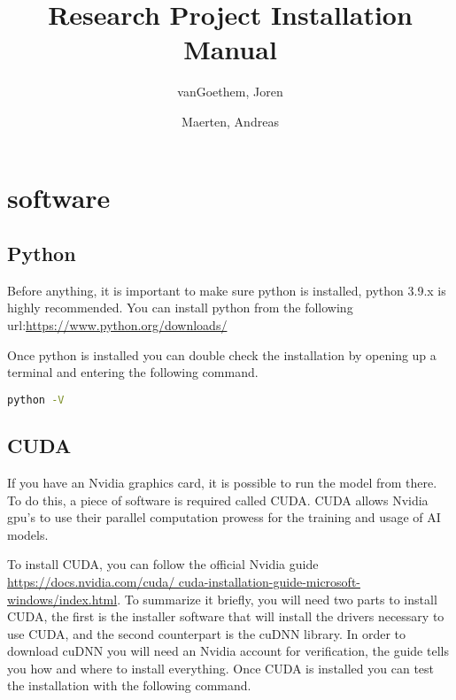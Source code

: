 \documentclass[12pt,a4paper]{article}
\begin{document}
\begin{titlepage}
    \author{
        vanGoethem, Joren
        \and
        Maerten, Andreas
    }
    \title{Research Project Installation Manual}
\end{titlepage}

\maketitle
\newpage
\tableofcontents
\newpage


\section{software}

\subsection{Python}

Before anything, it is important to make sure python is installed, python 3.9.x is highly recommended.
You can install python from the following url:\newline\newline \href{https://www.python.org/downloads/}{https://www.python.org/downloads/}\newline

Once python is installed you can double check the installation by opening up a terminal and entering the following command.

\begin{lstlisting}[language=bash]
    python -V
\end{lstlisting}

\subsection{CUDA}
If you have an Nvidia graphics card, it is possible to run the model from there. To do this, a piece of
software is required called CUDA. CUDA allows Nvidia gpu's to use their parallel computation prowess for
the training and usage of AI models.\newline

To install CUDA, you can follow the official Nvidia guide \href{https://docs.nvidia.com/cuda/
cuda-installation-guide-microsoft-windows/index.html}{https://docs.nvidia.com/cuda/
cuda-installation-guide-microsoft-windows/index.html}. To summarize it briefly, you will need two parts
to install CUDA, the first is the installer software that will install the drivers necessary to use CUDA, 
and the second counterpart is the cuDNN library. In order to download cuDNN you will need an Nvidia account
for verification, the guide tells you how and where to install everything. Once CUDA is 
installed you can test the installation with the following command.
\end{document}
